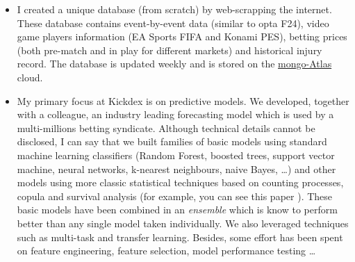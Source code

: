 \documentclass[a4paper,twoside,11pt]{article}
\begin{document}
\begin{itemize}
\item I created a unique database (from scratch) by web-scrapping the
internet. These database contains event-by-event data (similar to
opta F24), video game players information (EA Sports FIFA and Konami PES),
betting prices (both pre-match and in play for different markets) and
historical injury record. The database is updated weekly and is stored on
the \href{https://www.mongodb.com/cloud/atlas}{mongo-Atlas} cloud.

\item My primary focus at Kickdex is on predictive models. We developed, together
with a colleague, an industry leading forecasting model which is used by a
multi-millions betting syndicate. Although technical details cannot be
disclosed, I can say that we built families of basic models using standard
machine learning classifiers (Random Forest, boosted trees, support vector
machine, neural networks, k-nearest neighbours, naive Bayes, \ldots{}) and other
models using more classic statistical techniques based on counting processes,
copula and survival analysis (for example, you can see this paper
\citep{boshnakov2017bivariate}). These basic models have been combined in an
\emph{ensemble} which is know to perform better than any single model taken
individually. We also leveraged techniques such as multi-task and transfer
learning. Besides, some effort has been spent on feature engineering, feature
selection, model performance testing \ldots{}


\end{itemize}
\end{document}
